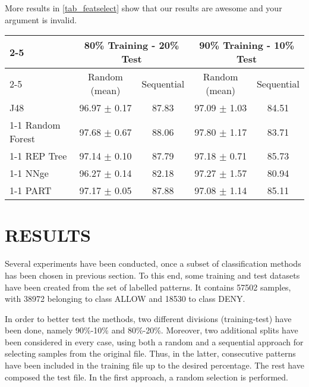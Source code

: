 \documentclass{llncs}
\begin{document}
More results in \ref{tab_featselect} show that our results are awesome and your argument is invalid.

\begin{table*}[htpb]
\centering
 \caption{\label{tab_featselect} Percentage of correctly classified patterns for non-balanced data}
{\small
\begin{tabular}{|l|c|c|c|c|}
\cline{2-5}
\multicolumn{1}{l|}{} & \multicolumn{2}{c|}{80\% Training - 20\% Test} & \multicolumn{2}{c|}{90\% Training - 10\% Test} \\ 
\cline{2-5}
\multicolumn{1}{l|}{} & Random (mean) & Sequential & Random (mean) & Sequential \\ 
\hline
J48 & 96.97 $\pm$ 0.17 & 87.83 & 97.09 $\pm$ 1.03 & 84.51 \\ 
\cline{1-1}
Random Forest & 97.68 $\pm$ 0.67 & 88.06 & 97.80 $\pm$ 1.17 & 83.71 \\ 
\cline{1-1}
REP Tree & 97.14 $\pm$ 0.10 & 87.79 & 97.18 $\pm$ 0.71 & 85.73 \\ 
\cline{1-1}
NNge & 96.27 $\pm$ 0.14 & 82.18 & 97.27 $\pm$ 1.57 & 80.94 \\ 
\cline{1-1}
PART & 97.17 $\pm$ 0.05 & 87.88 & 97.08 $\pm$ 1.14 & 85.11 \\ 
\hline
\end{tabular}
}
\end{table*}

%
\section{\uppercase{Results}}
\label{sec:results}

\noindent Several experiments have been conducted, once a subset of classification methods has been chosen in previous section.
To this end, some training and test datasets have been created from
the set of labelled patterns. It contains 57502 samples, with 38972
belonging to class ALLOW and 18530 to class DENY.

In order to better test the methods, two different divisions (training-test) have been done, namely 90\%-10\% and 80\%-20\%. Moreover, two additional splits have been considered in every case, using both a random and a sequential approach for selecting samples from the original file. Thus, in the latter, consecutive patterns have been included in the training file up to the desired percentage. The rest have composed the test file. In the first approach, a random selection is performed.
\end{document}

